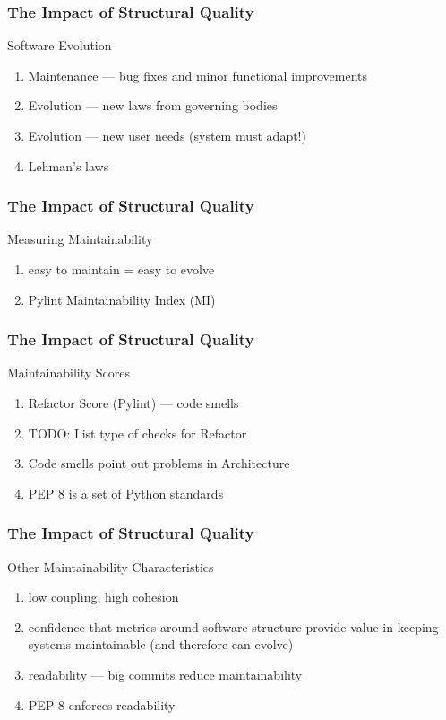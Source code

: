 \documentclass{beamer}
\begin{document}
\begin{frame}
  \frametitle{The Impact of Structural Quality}
  Software Evolution
  \begin{enumerate}
    \item Maintenance --- bug fixes and minor functional improvements
    \item Evolution --- new laws from governing bodies
    \item Evolution --- new user needs (system must adapt!)
    \item Lehman's laws
  \end{enumerate}
\end{frame}

\begin{frame}
  \frametitle{The Impact of Structural Quality}
  Measuring Maintainability
  \begin{enumerate}
    \item easy to maintain = easy to evolve
    \item Pylint Maintainability Index (MI)
  \end{enumerate}
\end{frame}

\begin{frame}
  \frametitle{The Impact of Structural Quality}
  Maintainability Scores
  \begin{enumerate}
    \item Refactor Score (Pylint) --- code smells
    \item TODO: List type of checks for Refactor
    \item Code smells point out problems in Architecture
    \item PEP 8 is a set of Python standards
  \end{enumerate}
\end{frame}

\begin{frame}
  \frametitle{The Impact of Structural Quality}
  Other Maintainability Characteristics
  \begin{enumerate}
    \item low coupling, high cohesion
    \item confidence that metrics around software structure provide value in keeping systems maintainable (and therefore can evolve) %
    \item readability --- big commits reduce maintainability
    \item PEP 8 enforces readability
  \end{enumerate}
\end{frame}
\end{document}
